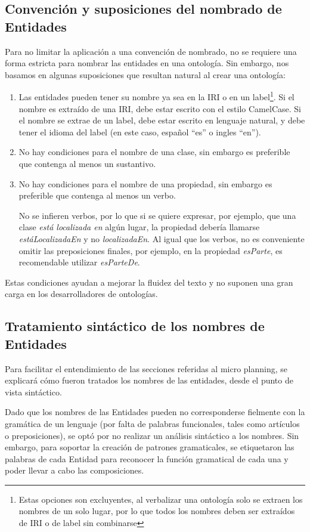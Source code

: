 \subsection{Convención y suposiciones del nombrado de Entidades}
Para no limitar la aplicación a una convención de nombrado, no se requiere una forma estricta para nombrar las entidades en una ontología. Sin embargo, nos basamos en algunas suposiciones que resultan natural al crear una ontología:
\begin{enumerate}
    \item Las entidades pueden tener su nombre ya sea en la IRI o en un label\footnote{Estas opciones son excluyentes, al verbalizar una ontología solo se extraen los nombres de un solo lugar, por lo que todos los nombres deben ser extraídos de IRI o de label sin combinarse}. Si el nombre es extraído de una IRI, debe estar escrito con el estilo CamelCase. Si el nombre se extrae de un label, debe estar escrito en lenguaje natural, y debe tener el idioma del label (en este caso, español ``es'' o ingles ``en'').
    \item No hay condiciones para el nombre de una clase, sin embargo es preferible que contenga al menos un sustantivo.
    \item No hay condiciones para el nombre de una propiedad, sin embargo es preferible que contenga al menos un verbo. 
    
    No se infieren verbos, por lo que si se quiere expresar, por ejemplo, que una clase \emph{está localizada en} algún lugar, la propiedad debería llamarse \emph{estáLocalizadaEn} y no \emph{localizadaEn}. Al igual que los verbos, no es conveniente omitir las preposiciones finales, por ejemplo, en la propiedad \emph{esParte}, es recomendable utilizar \emph{esParteDe}.
\end{enumerate}

Estas condiciones ayudan a mejorar la fluidez del texto y no suponen una gran carga en los desarrolladores de ontologías.


\subsection{Tratamiento sintáctico de los nombres de Entidades}
Para facilitar el entendimiento de las secciones referidas al micro planning, se explicará cómo fueron tratados los nombres de las entidades, desde el punto de vista sintáctico. 

Dado que los nombres de las Entidades pueden no corresponderse fielmente con la gramática de un lenguaje (por falta de palabras funcionales, tales como artículos o preposiciones), se optó por no realizar un análisis sintáctico a los nombres. Sin embargo, para soportar la creación de patrones gramaticales, se etiquetaron las palabras de cada Entidad para reconocer la función gramatical de cada una y poder llevar a cabo las composiciones.

